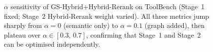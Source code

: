 \begin{figure}[!t]
{}%
\caption{$\alpha$ sensitivity of GS-Hybrid+Hybrid-Rerank on ToolBench
(Stage~1 fixed; Stage~2 Hybrid-Rerank weight varied).
All three metrics jump sharply from $\alpha{=}0$ (semantic only)
to $\alpha{=}0.1$ (graph added), then plateau over
$\alpha\!\in\![0.3,\,0.7]$, confirming that Stage~1 and Stage~2
can be optimised independently.}
\label{fig:alpha}
\end{figure}
